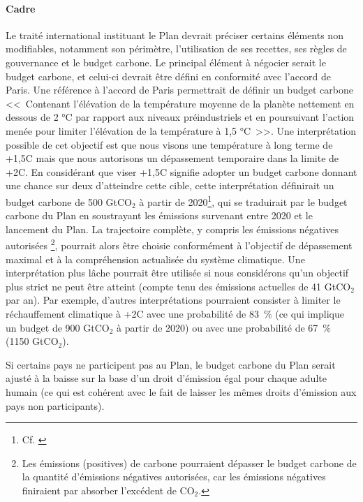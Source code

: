 \documentclass[a5paper,french]{memoir}
\begin{document}
\paragraph{Cadre} 
Le traité international instituant le Plan devrait préciser certains éléments non modifiables, notamment son périmètre, l'utilisation de ses recettes, ses règles de gouvernance et le budget carbone. Le principal élément à négocier serait le budget carbone, et celui-ci devrait être défini en conformité avec l'accord de Paris. Une référence à l'accord de Paris permettrait de définir un budget carbone <<~Contenant l'élévation de la température moyenne de la planète nettement en dessous de 2 °C par rapport aux niveaux préindustriels et en poursuivant l'action menée pour limiter l'élévation de la température à 1,5 °C~>>. Une interprétation possible de cet objectif est que nous visons une température à long terme de +1,5\textdegree{}C mais que nous autorisons un dépassement temporaire dans la limite de +2\textdegree{}C. 
En considérant que viser +1,5\textdegree{}C signifie adopter un budget carbone donnant une chance sur deux d'atteindre cette cible, cette interprétation définirait un budget carbone de 500 GtCO$_\text{2}$ à partir de 2020\footnote{Cf. \cite{ipcc_climate_2021}}, qui se traduirait par le budget carbone du Plan en soustrayant les émissions survenant entre 2020 et le lancement du Plan. La trajectoire complète, y compris les émissions négatives autorisées
\footnote{Les émissions (positives) de carbone pourraient dépasser le budget carbone de la quantité d'émissions négatives autorisées, car les émissions négatives finiraient par absorber l'excédent de CO$_\text{2}$.}, 
pourrait alors être choisie conformément à l'objectif de dépassement maximal et à la compréhension actualisée du système climatique. Une interprétation plus lâche %
pourrait être utilisée si nous considérons qu'un objectif plus strict ne peut être atteint (compte tenu des émissions actuelles de 41 GtCO$_\text{2}$ par an). Par exemple, d'autres interprétations pourraient consister à limiter le réchauffement climatique à +2\textdegree{}C avec une probabilité de 83~\% (ce qui implique un budget de 900 GtCO$_\text{2}$ à partir de 2020) ou avec une probabilité de 67~\% (1150 GtCO$_\text{2}$). %

Si certains pays ne participent pas au Plan, le budget carbone du Plan serait ajusté à la baisse sur la base d'un droit d'émission égal pour chaque adulte humain (ce qui est cohérent avec le fait de laisser les mêmes droits d'émission aux pays non participants).
\end{document}
